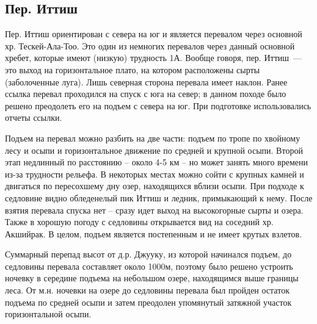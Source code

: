 \subsection{Пер. Иттиш}

Пер. Иттиш ориентирован с севера на юг и является перевалом через основной хр. Тескей-Ала-Тоо. Это один из немногих перевалов через данный основной хребет, которые имеют (низкую) трудность 1А. Вообще говоря, пер. Иттиш~--- это выход на горизонтальное плато, на котором расположены сырты (заболоченные луга). Лишь северная сторона перевала имеет наклон. Ранее \alert{ссылка} перевал проходился на спуск с юга на север; в данном походе было решено преодолеть его на подъем с севера на юг. При подготовке использовались отчеты \alert{ссылки}.

Подъем на перевал можно разбить на две части: подъем по тропе по хвойному лесу и осыпи и горизонтальное движение по средней и крупной осыпи. Второй этап недлинный по расстоянию -- около 4-5 км -- но может занять много времени из-за трудности рельефа. В некоторых местах можно сойти с крупных камней и двигаться по пересохшему дну озер, находящихся вблизи осыпи. При подходе к седловине видно обледенелый пик Иттиш и ледник, примыкающий к нему. После взятия перевала спуска нет -- сразу идет выход на высокогорные сырты и озера. Также в хорошую погоду с седловины открывается вид на соседний хр. Акшийрак. В целом, подъем является постепенным и не имеет крутых взлетов.

Суммарный перепад высот от д.р. Джууку, из которой начинался подъем, до седловины перевала составляет около 1000м, поэтому было решено устроить ночевку в середине подъема на небольшом озере, находящимся выше границы леса. От м.н. ночевки на озере до седловины перевала был пройден остаток подъема по средней осыпи и затем преодолен упомянутый затяжной участок горизонтальной осыпи.